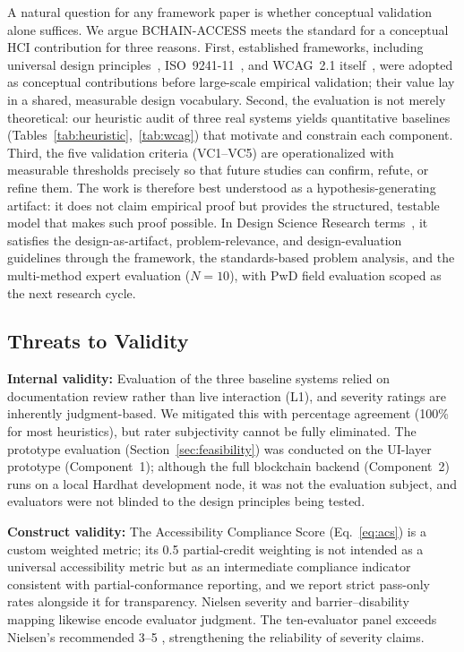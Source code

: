 \documentclass[journal,onecolumn]{IEEEtran}
\begin{document}
A natural question for any framework paper is whether conceptual validation alone suffices. We argue BCHAIN-ACCESS meets the standard for a conceptual HCI contribution for three reasons. First, established frameworks, including universal design principles~\cite{elsden2018making}, ISO~9241-11~\cite{iso9241}, and WCAG~2.1 itself~\cite{wcag21}, were adopted as conceptual contributions before large-scale empirical validation; their value lay in a shared, measurable design vocabulary. Second, the evaluation is not merely theoretical: our heuristic audit of three real systems yields quantitative baselines (Tables~\ref{tab:heuristic},~\ref{tab:wcag}) that motivate and constrain each component. Third, the five validation criteria (VC1--VC5) are operationalized with measurable thresholds precisely so that future studies can confirm, refute, or refine them. The work is therefore best understood as a hypothesis-generating artifact: it does not claim empirical proof but provides the structured, testable model that makes such proof possible. In Design Science Research terms~\cite{hevner2004design}, it satisfies the design-as-artifact, problem-relevance, and design-evaluation guidelines through the framework, the standards-based problem analysis, and the multi-method expert evaluation ($N=10$), with PwD field evaluation scoped as the next research cycle.



\subsection{Threats to Validity}

\textbf{Internal validity:} Evaluation of the three baseline systems relied on documentation review rather than live interaction (L1), and severity ratings are inherently judgment-based. We mitigated this with percentage agreement (100\% for most heuristics), but rater subjectivity cannot be fully eliminated. The prototype evaluation (Section~\ref{sec:feasibility}) was conducted on the UI-layer prototype (Component~1); although the full blockchain backend (Component~2) runs on a local Hardhat development node, it was not the evaluation subject, and evaluators were not blinded to the design principles being tested.

\textbf{Construct validity:} The Accessibility Compliance Score (Eq.~\ref{eq:acs}) is a custom weighted metric; its 0.5 partial-credit weighting is not intended as a universal accessibility metric but as an intermediate compliance indicator consistent with partial-conformance reporting, and we report strict pass-only rates alongside it for transparency. Nielsen severity and barrier--disability mapping likewise encode evaluator judgment. The ten-evaluator panel exceeds Nielsen's recommended 3--5 \cite{nielsen1994usability}, strengthening the reliability of severity claims.
\end{document}
